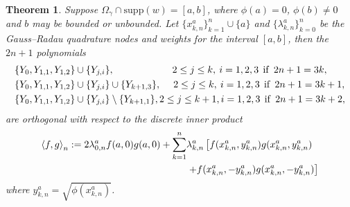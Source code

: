 \documentclass{amsart}
\newtheorem{thm}{Theorem}[section]
\theoremstyle{remark}
\def\la{{\langle}}
\def\ra{{\rangle}}
\def\g{{\gamma}}
\def\la{{\langle}}
\def\ra{{\rangle}}
\begin{document}
\begin{thm}  \label{thm:GR}
Suppose $\Omega_\g \cap \mathrm{supp}(w) = [a, b]$, where $\phi(a) = 0$, $\phi(b) \neq 0$ and $b$ may be bounded or unbounded. Let $\lbrace x_{k,n}^a \rbrace_{k=1}^{n} \cup \lbrace a \rbrace$ and $\lbrace \lambda_{k,n}^a \rbrace_{k=0}^{n}$ be the Gauss--Radau quadrature nodes and weights for the interval $[a, b]$, then the $2n+1$ polynomials 
\begin{align}
& \lbrace Y_{0}, Y_{1,1}, Y_{1,2}   \rbrace \cup  \lbrace Y_{j,i}  \rbrace,\qquad \qquad \qquad  2 \leq j \leq k,\: i= 1, 2, 3\:\:\mathrm{ if }\:\: 2n + 1 = 3k, \label{eq:GRbasisc1}  \\
& \lbrace Y_{0}, Y_{1,1}, Y_{1,2}   \rbrace \cup  \lbrace Y_{j,i}  \rbrace  \cup \lbrace Y_{k+1,3}   \rbrace, \hspace{0.45 cm} 2 \leq j \leq k,\: i= 1, 2, 3  \:\:\mathrm{ if }\:\: 2n + 1 = 3k+1, \\
& \lbrace Y_{0}, Y_{1,1}, Y_{1,2}   \rbrace \cup  \lbrace Y_{j,i}  \rbrace \setminus \lbrace  Y_{k+1,1} \rbrace , 2 \leq j \leq k+1, i= 1, 2, 3 \:\:\mathrm{if}\:\: 2n + 1 = 3k+2, \label{eq:GRbasisc3}  
\end{align}
are orthogonal with respect to the discrete inner product
\begin{align}
\la f,g \ra_n := 2\lambda_{0,n}^a f(a,0)g(a,0) +   \sum_{k=1}^n &\lambda_{k,n}^a\left[ f(x_{k,n}^a,y_{k,n}^a)g(x_{k,n}^a,y_{k,n}^a) \right.  \label{eq:GRip} \\ 
& \left. + f(x_{k,n}^a,-y_{k,n}^a)g(x_{k,n}^a,-y_{k,n}^a) \right] \notag
\end{align}
where $y_{k,n}^a = \sqrt{\phi(x_{k,n}^a)}$.
\end{thm}
\end{document}

